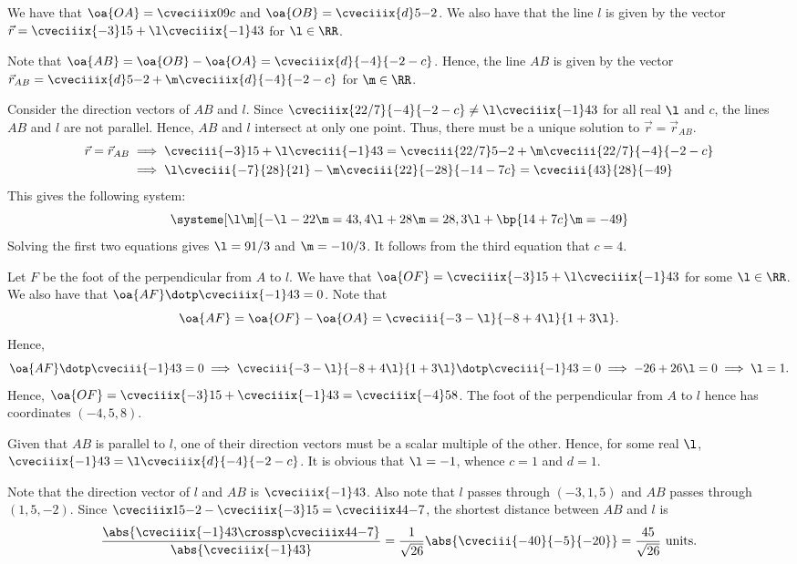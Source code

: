\begin{solution}
    We have that $\oa{OA} = \cveciiix09c$ and $\oa{OB} = \cveciiix{d}5{-2}$. We also have that the line $l$ is given by the vector $\vec r = \cveciiix{-3}15 + \l \cveciiix{-1}43$ for $\l \in \RR$.

    Note that $\oa{AB} = \oa{OB} - \oa{OA} = \cveciiix{d}{-4}{-2-c}$. Hence, the line $AB$ is given by the vector $\vec r_{AB} = \cveciiix{d}5{-2} + \m \cveciiix{d}{-4}{-2-c}$ for $\m \in \RR$.

    \begin{ppart}
        Consider the direction vectors of $AB$ and $l$. Since $\cveciiix{22/7}{-4}{-2-c} \neq \l\cveciiix{-1}43$ for all real $\l$ and $c$, the lines $AB$ and $l$ are not parallel. Hence, $AB$ and $l$ intersect at only one point. Thus, there must be a unique solution to $\vec r = \vec r_{AB}$.
        \begin{align*}
            \vec r = \vec r_{AB} &\implies \cveciii{-3}15 + \l \cveciii{-1}43 = \cveciii{22/7}5{-2} + \m \cveciii{22/7}{-4}{-2-c}\\
            &\implies \l \cveciii{-7}{28}{21} - \m\cveciii{22}{-28}{-14-7c} = \cveciii{43}{28}{-49}
        \end{align*}
        This gives the following system: \[\systeme[\l\m]{
                {-}\l - 22\m = 43,
                4\l + 28\m = 28,
                3\l + \bp{14 + 7c}\m = -49
            }
        \] Solving the first two equations gives $\l = 91/3$ and $\m = -10/3$. It follows from the third equation that $c = 4$.

        Let $F$ be the foot of the perpendicular from $A$ to $l$. We have that $\oa{OF} = \cveciiix{-3}15 + \l\cveciiix{-1}43$ for some $\l \in \RR$. We also have that $\oa{AF} \dotp \cveciiix{-1}43 = 0$. Note that \[\oa{AF} = \oa{OF} - \oa{OA} = \cveciii{-3-\l}{-8+4\l}{1 + 3\l}.\] Hence, \[\oa{AF} \dotp \cveciii{-1}43 = 0 \implies \cveciii{-3-\l}{-8+4\l}{1 + 3\l} \dotp \cveciii{-1}43 = 0 \implies -26 + 26 \l = 0 \implies \l = 1.\] Hence, $\oa{OF} = \cveciiix{-3}15 + \cveciiix{-1}43 = \cveciiix{-4}58$. The foot of the perpendicular from $A$ to $l$ hence has coordinates $(-4, 5, 8)$.
    \end{ppart}
    \begin{ppart}
        Given that $AB$ is parallel to $l$, one of their direction vectors must be a scalar multiple of the other. Hence, for some real $\l$, $\cveciiix{-1}4{3} = \l\cveciiix{d}{-4}{-2-c}$. It is obvious that $\l = -1$, whence $c = 1$ and $d = 1$.

        Note that the direction vector of $l$ and $AB$ is $\cveciiix{-1}43$. Also note that $l$ passes through $(-3, 1, 5)$ and $AB$ passes through $(1, 5, -2)$. Since $\cveciiix15{-2} - \cveciiix{-3}15 = \cveciiix44{-7}$, the shortest distance between $AB$ and $l$ is \[\frac{\abs{\cveciiix{-1}43 \crossp \cveciiix44{-7}}}{\abs{\cveciiix{-1}43}} = \frac1{\sqrt{26}} \abs{\cveciii{-40}{-5}{-20}} = \frac{45}{\sqrt{26}} \text{ units}.\]
    \end{ppart}
\end{solution}

